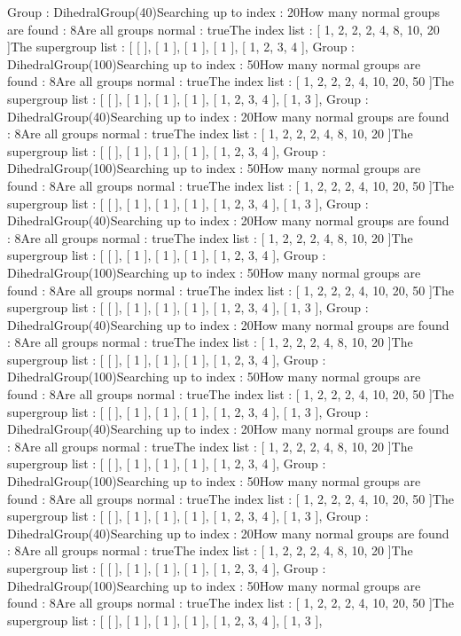 Group : DihedralGroup(40)Searching up to index : 20How many normal groups are found : 8Are all groups normal : trueThe index list : [ 1, 2, 2, 2, 4, 8, 10, 20 ]The supergroup list : [ [  ], [ 1 ], [ 1 ], [ 1 ], [ 1, 2, 3, 4 ],
Group : DihedralGroup(100)Searching up to index : 50How many normal groups are found : 8Are all groups normal : trueThe index list : [ 1, 2, 2, 2, 4, 10, 20, 50 ]The supergroup list : [ [  ], [ 1 ], [ 1 ], [ 1 ], [ 1, 2, 3, 4 ], [ 1, 3 ],
Group : DihedralGroup(40)Searching up to index : 20How many normal groups are found : 8Are all groups normal : trueThe index list : [ 1, 2, 2, 2, 4, 8, 10, 20 ]The supergroup list : [ [  ], [ 1 ], [ 1 ], [ 1 ], [ 1, 2, 3, 4 ],
Group : DihedralGroup(100)Searching up to index : 50How many normal groups are found : 8Are all groups normal : trueThe index list : [ 1, 2, 2, 2, 4, 10, 20, 50 ]The supergroup list : [ [  ], [ 1 ], [ 1 ], [ 1 ], [ 1, 2, 3, 4 ], [ 1, 3 ],
Group : DihedralGroup(40)Searching up to index : 20How many normal groups are found : 8Are all groups normal : trueThe index list : [ 1, 2, 2, 2, 4, 8, 10, 20 ]The supergroup list : [ [  ], [ 1 ], [ 1 ], [ 1 ], [ 1, 2, 3, 4 ],
Group : DihedralGroup(100)Searching up to index : 50How many normal groups are found : 8Are all groups normal : trueThe index list : [ 1, 2, 2, 2, 4, 10, 20, 50 ]The supergroup list : [ [  ], [ 1 ], [ 1 ], [ 1 ], [ 1, 2, 3, 4 ], [ 1, 3 ],
Group : DihedralGroup(40)Searching up to index : 20How many normal groups are found : 8Are all groups normal : trueThe index list : [ 1, 2, 2, 2, 4, 8, 10, 20 ]The supergroup list : [ [  ], [ 1 ], [ 1 ], [ 1 ], [ 1, 2, 3, 4 ],
Group : DihedralGroup(100)Searching up to index : 50How many normal groups are found : 8Are all groups normal : trueThe index list : [ 1, 2, 2, 2, 4, 10, 20, 50 ]The supergroup list : [ [  ], [ 1 ], [ 1 ], [ 1 ], [ 1, 2, 3, 4 ], [ 1, 3 ],
Group : DihedralGroup(40)Searching up to index : 20How many normal groups are found : 8Are all groups normal : trueThe index list : [ 1, 2, 2, 2, 4, 8, 10, 20 ]The supergroup list : [ [  ], [ 1 ], [ 1 ], [ 1 ], [ 1, 2, 3, 4 ],
Group : DihedralGroup(100)Searching up to index : 50How many normal groups are found : 8Are all groups normal : trueThe index list : [ 1, 2, 2, 2, 4, 10, 20, 50 ]The supergroup list : [ [  ], [ 1 ], [ 1 ], [ 1 ], [ 1, 2, 3, 4 ], [ 1, 3 ],
Group : DihedralGroup(40)Searching up to index : 20How many normal groups are found : 8Are all groups normal : trueThe index list : [ 1, 2, 2, 2, 4, 8, 10, 20 ]The supergroup list : [ [  ], [ 1 ], [ 1 ], [ 1 ], [ 1, 2, 3, 4 ],
Group : DihedralGroup(100)Searching up to index : 50How many normal groups are found : 8Are all groups normal : trueThe index list : [ 1, 2, 2, 2, 4, 10, 20, 50 ]The supergroup list : [ [  ], [ 1 ], [ 1 ], [ 1 ], [ 1, 2, 3, 4 ], [ 1, 3 ],
